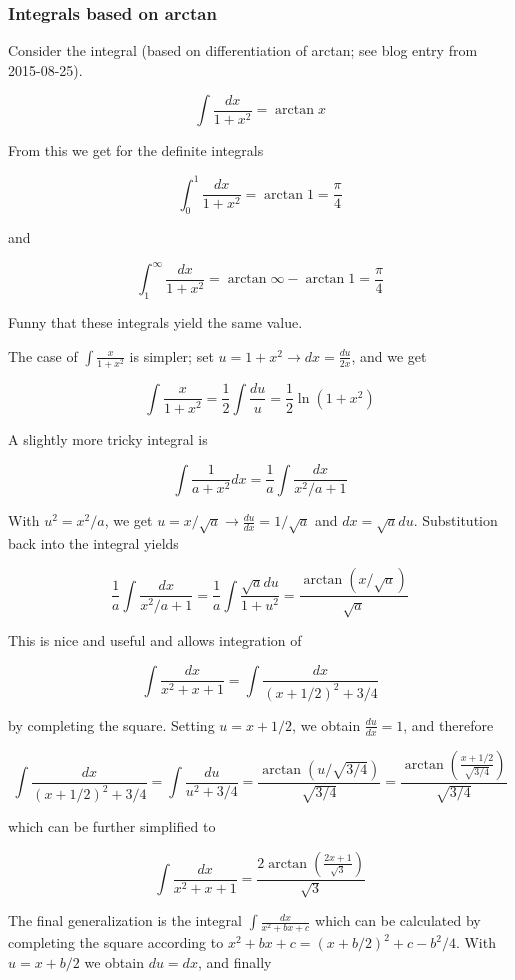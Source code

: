 

\subsubsection{Integrals based on arctan}

Consider the integral (based on differentiation of arctan; see blog entry from 2015-08-25).


\[\int \frac{dx}{1+x^2} = \arctan x\]

From this we get for the definite integrals

\[ \int_0^1 \frac{dx}{1+x^2} = \arctan 1 = \frac{\pi}{4}\]

and

\[ \int_1^\infty \frac{dx}{1+x^2} = \arctan \infty - \arctan 1 = \frac{\pi}{4}\]

Funny that these integrals yield the same value.

The case of $\int\frac{x}{1+x^2}$ is simpler; set $u=1+x^2 \rightarrow dx = \frac{du}{2x}$, and we get

\[\int\frac{x}{1+x^2} = \frac{1}{2} \int \frac{du}{u} = \frac{1}{2} \ln(1+x^2)\]

A slightly more tricky integral is

\[\int \frac{1}{a+x^2} dx = \frac{1}{a} \int \frac{dx}{x^2/a+1}\]

With $u^2 = x^2/a$, we get $u = x / \sqrt{a} \rightarrow \frac{du}{dx} = 1 / \sqrt{a}$ and $dx = \sqrt{a} du$. Substitution back into the integral yields

\[ \frac{1}{a} \int \frac{dx}{x^2/a+1} = \frac{1}{a} \int \frac{\sqrt{a} du}{1+u^2} = \frac{\arctan (x/\sqrt{a})}{\sqrt{a}}\]

This is nice and useful and allows integration of

\[\int \frac{dx}{x^2+x+1} = \int \frac{dx}{(x+1/2)^2 + 3/4} \]

by completing the square. Setting $u = x+1/2$, we obtain $\frac{du}{dx} = 1$, and therefore

\[\int \frac{dx}{(x+1/2)^2 + 3/4} = \int \frac{du}{u^2 + 3/4} = \frac{\arctan (u/\sqrt{3/4})}{\sqrt{3/4}} = \frac{\arctan \left( \frac{x+1/2}{\sqrt{3/4}} \right)}{\sqrt{3/4}}\]

which can be further simplified to

\[ \int \frac{dx}{x^2+x+1} = \frac{2 \arctan \left( \frac{2x+1}{\sqrt{3}} \right)}{\sqrt{3}} \]

The final generalization is the integral $\int\frac{dx}{x^2+bx+c}$ which can be calculated by completing the square according to
$x^2+bx+c = (x+b/2)^2 + c - b^2/4$. With $u=x+b/2$ we
obtain $du=dx$, and finally


